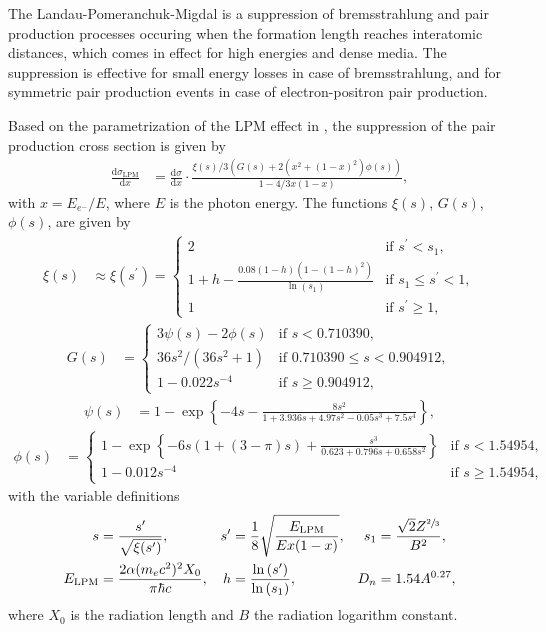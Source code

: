 The Landau-Pomeranchuk-Migdal is a suppression of bremsstrahlung and pair production processes occuring when the formation length reaches interatomic distances, which comes in effect for high energies and dense media.
The suppression is effective for small energy losses in case of bremsstrahlung, and for symmetric pair production events in case of electron-positron pair production.

Based on the parametrization of the LPM effect in \cite{RevModPhys.71.1501}, the suppression of the pair production cross section is given by
%
\begin{align}
	\label{eqn:lpm_photopair}
	\frac{\mathrm{d}\sigma_\text{LPM}}{\mathrm{d}x} &= \frac{\mathrm{d}\sigma}{\mathrm{d}x} \cdot \frac{\xi(s) / 3 \left(G(s) + 2 \left( x^2 + (1 - x)^2 \right) \phi(s) \right)}{1 - 4 / 3 x (1 - x)},
\end{align}
%
with $x = E_{e^{-}} / E$, where $E$ is the photon energy.
The functions $\xi(s)$, $G(s)$, $\phi(s)$, are given by \cite{PhysRevD.25.1291, PhysRev.103.1811}
%
\begin{align}
	\xi(s) &\approx \xi(s^\prime) =
	\begin{cases}
		2 & \text{if $s^\prime < s_1$}, \\
		1 + h - \frac{0.08 (1 - h) (1 - (1-h)^2)}{\ln{(s_1)}} & \text{if $s_1 \leq s^\prime < 1$}, \\
		1 & \text{if $s^\prime \geq 1$},
	\end{cases}
\end{align}
%
\begin{align}
	G(s) &=
	\begin{cases}
		3\psi(s) - 2\phi(s) & \text{if $s < \num{0.710390}$}, \\
		36s^2 / \left(36s^2 + 1 \right) & \text{if $\num{0.710390} \leq s < \num{0.904912}$}, \\
		1 - 0.022s^{-4} & \text{if $s \geq \num{0.904912}$},
	\end{cases}
\end{align}
%
\begin{align}
	\psi(s) &= 1 - \exp{\left\{ -4s - \frac{8s^2}{1 + 3.936s + 4.97s^2 - 0.05s^3 + 7.5 s^4} \right\}},
\end{align}
%
\begin{align}
	\phi(s) &=
	\begin{cases}
		1 - \exp{\left\{ -6s \left(1 + (3 - \pi) s\right) + \frac{s^3}{ 0.623 + 0.796s + 0.658 s^2} \right\}} & \text{if $s < \num{1.54954}$}, \\
		1 - 0.012 s^{-4} & \text{if $s \geq \num{1.54954}$},
	\end{cases}
\end{align}
%
with the variable definitions
%
\begin{align}
	s &= \frac{s^\prime}{\sqrt{\xi(s^\prime)}}, & s^\prime &= \frac{1}{8} \sqrt{\frac{E_\text{LPM}}{E x ( 1 - x)}}, & s_1 &= \frac{\sqrt{2} Z^{\sfrac{2}{3}}}{B^2}, \\ E_\text{LPM} &= \frac{2 \alpha (m_e c^2)^2 X_0}{\pi \hbar c}, & h &= \frac{\ln{(s^\prime)}}{\ln{(s_1)}}, & D_n &= 1.54 A^{0.27},
\end{align}
%
where $X_0$ is the radiation length and $B$ the radiation logarithm constant.


